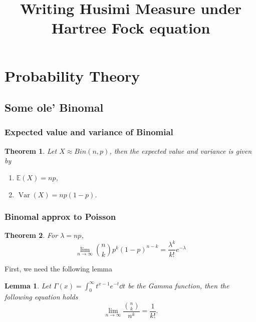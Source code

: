 \documentclass[10pt]{article}
\title{Writing Husimi Measure under Hartree Fock equation}
\date{}
\author{}
\theoremstyle{remark}
\theoremstyle{plain}
\newtheorem{Theorem}{Theorem}[section]
\newtheorem{Lemma}{Lemma}[section]
\DeclareMathOperator{\Var}{Var}
\numberwithin{equation}{section}
\begin{document}
\setcounter{secnumdepth}{5}

%
%
\section{Probability Theory}
\subsection{Some ole' Binomal}
\subsubsection{Expected value and variance of Binomial}
\begin{Theorem}\label{binom_exp_var}
	Let $X \approx Bin(n,p)$, then the expected value and variance is given by
	\begin{enumerate}
		\item $\mathbb{E}(X) = np$,
		\item $\Var(X) = np(1-p)$.
	\end{enumerate}
\end{Theorem}
\subsubsection{Binomal approx to Poisson}
\begin{Theorem}\label{binom_approx_poisosn}
	For $\lambda = np $,
	$$ \lim_{n  \to \infty} \binom{n}{k} p^k {(1 - p)}^{n - k} = \frac {\lambda^k} {k!} e^{-\lambda}$$
\end{Theorem}

First, we need the following lemma
\begin{Lemma}\label{inf_binom_over_power}
	Let $\Gamma(x) = \int_0^\infty t^{x-1} e^{-t} \dd{t}$ be the Gamma function, then the following equation holds
	\[
		\lim_{n \to \infty} \frac{\binom{n}{k}}{n^k} = \frac{1}{k!}.
	\]
\end{Lemma}
\end{document}
